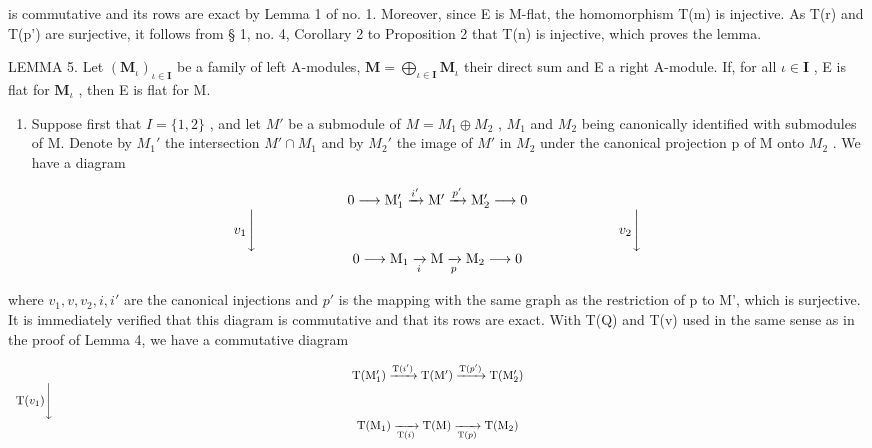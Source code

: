 is commutative and its rows are exact by Lemma 1 of no. 1. Moreover, since E is M-flat, the homomorphism T(m) is injective. As T(r) and T(p') are surjective, it follows from § 1, no. 4, Corollary 2 to Proposition 2 that T(n) is injective, which proves the lemma.

LEMMA 5. Let \((\mathbf{M}_{\iota})_{\iota \in \mathbf{I}}\) be a family of left A-modules, \(\mathbf{M} = \bigoplus_{\iota \in \mathbf{I}} \mathbf{M}_{\iota}\) their direct sum and E a right A-module. If, for all \(\iota \in \mathbf{I}\) , E is flat for \(\mathbf{M}_{\iota}\) , then E is flat for M.

\begin{enumerate}
\def\labelenumi{(\alph{enumi})}
\tightlist
\item
  Suppose first that \(I = \{1, 2\}\) , and let \(M'\) be a submodule of \(M = M_{1} \oplus M_{2}\) , \(M_{1}\) and \(M_{2}\) being canonically identified with submodules of M. Denote by \(M_{1}'\) the intersection \(M' \cap M_{1}\) and by \(M_{2}'\) the image of \(M'\) in \(M_{2}\) under the canonical projection p of M onto \(M_{2}\) . We have a diagram
\end{enumerate}

\[
\begin{array}{c} 0 \longrightarrow \mathrm{M} _ {1} ^ {\prime} \xrightarrow {i ^ {\prime}} \mathrm{M} ^ {\prime} \xrightarrow {p ^ {\prime}} \mathrm{M} _ {2} ^ {\prime} \longrightarrow 0 \\ v _ {1} \Biggl \downarrow \qquad \qquad \qquad \qquad \qquad \qquad \qquad \qquad \qquad \qquad \qquad \qquad \qquad v _ {2} \Biggl \downarrow \\ 0 \longrightarrow \mathrm{M} _ {1} \xrightarrow [ i ]{} \mathrm{M} \xrightarrow [ p ]{} \mathrm{M} _ {2} \longrightarrow 0 \end{array}
\]

where \(v_{1}, v, v_{2}, i, i'\) are the canonical injections and \(p'\) is the mapping with the same graph as the restriction of p to M', which is surjective. It is immediately verified that this diagram is commutative and that its rows are exact. With T(Q) and T(v) used in the same sense as in the proof of Lemma 4, we have a commutative diagram

\[
\begin{array}{c} \mathrm{T} (\mathrm{M} _ {1} ^ {\prime}) \xrightarrow {\mathrm{T} (i ^ {\prime})} \mathrm{T} (\mathrm{M} ^ {\prime}) \xrightarrow {\mathrm{T} (p ^ {\prime})} \mathrm{T} (\mathrm{M} _ {2} ^ {\prime}) \\ \mathrm{T} (v _ {1}) \Biggl \downarrow \qquad \qquad \qquad \qquad \qquad \qquad \qquad \qquad \qquad \qquad \qquad \qquad \qquad \qquad \qquad \qquad \qquad \qquad \qquad \qquad \qquad \qquad \qquad \qquad \qquad \qquad \qquad \qquad \qquad \qquad \qquad \qquad \qquad \qquad \\ \mathrm{T} (\mathrm{M} _ {1}) \xrightarrow [ \mathrm{T} (i) ]{} \mathrm{T} (\mathrm{M}) \xrightarrow [ \mathrm{T} (p) ]{} \mathrm{T} (\mathrm{M} _ {2}) \end{array}
\]

